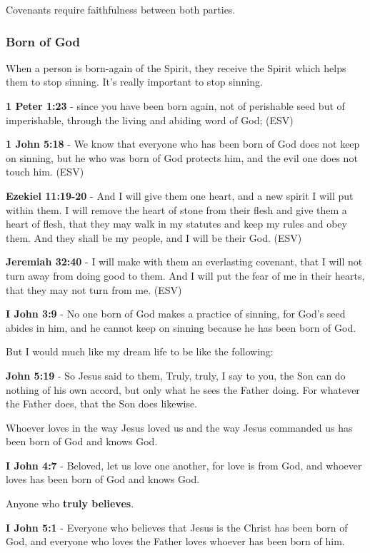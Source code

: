 \documentclass[11pt]{article}
\begin{document}
Covenants require faithfulness between both parties.

\subsubsection{Born of God}
\label{sec:org5146075}
When a person is born-again of the Spirit, they receive the Spirit which helps them to stop sinning. It's really important to stop sinning.

\textbf{1 Peter 1:23} - since you have been born again, not of perishable seed but of imperishable, through the living and abiding word of God; (ESV)

\textbf{1 John 5:18} - We know that everyone who has been born of God does not keep on sinning, but he who was born of God protects him, and the evil one does not touch him. (ESV)

\textbf{Ezekiel 11:19-20} - And I will give them one heart, and a new spirit I will put within them. I will remove the heart of stone from their flesh and give them a heart of flesh, that they may walk in my statutes and keep my rules and obey them. And they shall be my people, and I will be their God. (ESV)

\textbf{Jeremiah 32:40} - I will make with them an everlasting covenant, that I will not turn away from doing good to them. And I will put the fear of me in their hearts, that they may not turn from me. (ESV)

\textbf{I John 3:9} - No one born of God makes a practice of sinning, for God's seed abides in him, and he cannot keep on sinning because he has been born of God.

But I would much like my dream life to be like the following:

\textbf{John 5:19} - So Jesus said to them, Truly, truly, I say to you, the Son can do nothing of his own accord, but only what he sees the Father doing. For whatever the Father does, that the Son does likewise.

Whoever loves in the way Jesus loved us and the way Jesus commanded us has been born of God and knows God.

\textbf{I John 4:7} - Beloved, let us love one another, for love is from God, and whoever loves has been born of God and knows God.

Anyone who \textbf{truly believes}.

\textbf{I John 5:1} - Everyone who believes that Jesus is the Christ has been born of God, and everyone who loves the Father loves whoever has been born of him.
\end{document}
